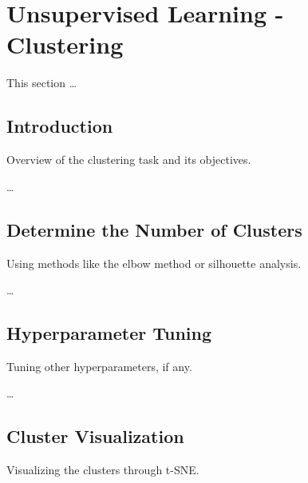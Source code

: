 

\section{Unsupervised Learning - Clustering}

    This section \ldots

    \subsection{Introduction}
    
        Overview of the clustering task and its objectives.

        \ldots

    \subsection{Determine the Number of Clusters}
    
        Using methods like the elbow method or silhouette analysis.

        \ldots
        
    \subsection{Hyperparameter Tuning}
    
        Tuning other hyperparameters, if any.

        \ldots
        
    \subsection{Cluster Visualization}
    
        Visualizing the clusters through t-SNE.

